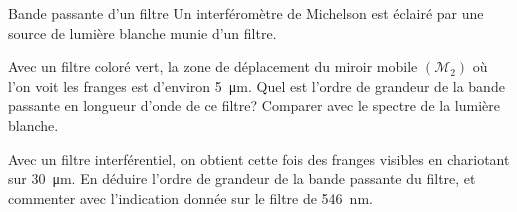 \begin{exo}[PC]{Bande passante d'un filtre}
Un interféromètre de Michelson est éclairé par une source de lumière blanche munie d'un filtre.
\begin{quest}
\item Avec un filtre coloré vert, la zone de déplacement du miroir mobile $(\mathcal{M}_2)$ où l'on voit les franges est d'environ \SI{5}{\micro\meter}. Quel est l'ordre de grandeur de la bande passante en longueur d'onde de ce filtre? Comparer avec le spectre de la lumière blanche.
\item Avec un filtre interférentiel, on obtient cette fois des franges visibles en chariotant sur \SI{30}{\micro\meter}. En déduire l'ordre de grandeur de la bande passante du filtre, et commenter avec l'indication donnée sur le filtre de \SI{546}{nm}.
\end{quest}
\end{exo}


